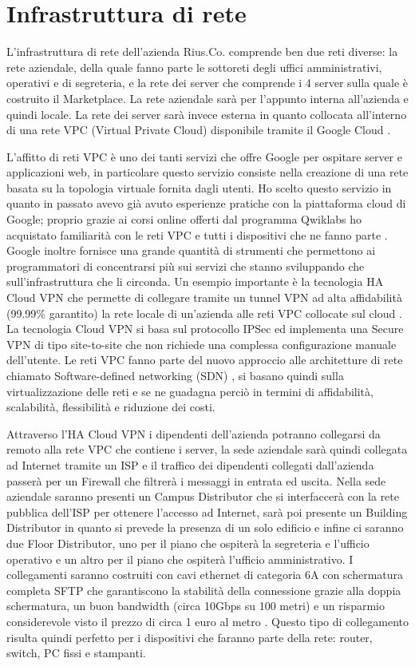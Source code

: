 \section{Infrastruttura di rete}
L'infrastruttura di rete dell'azienda Rius.Co. comprende ben due reti diverse: la rete aziendale, della quale fanno parte le sottoreti degli uffici amministrativi, operativi e di segreteria, e la rete dei server che comprende i 4 server sulla quale è costruito il Marketplace. La rete aziendale sarà per l'appunto interna all'azienda e quindi locale. La rete dei server sarà invece esterna in quanto collocata all'interno di una rete VPC (Virtual Private Cloud) disponibile tramite il Google Cloud \cite{VPC}. 
\medskip

L'affitto di reti VPC è uno dei tanti servizi che offre Google per ospitare server e applicazioni web, in particolare questo servizio consiste nella creazione di una rete basata su la topologia virtuale fornita dagli utenti. Ho scelto questo servizio in quanto in passato avevo già avuto esperienze pratiche con la piattaforma cloud di Google; proprio grazie ai corsi online offerti dal programma Qwiklabs ho acquistato familiarità con le reti VPC e tutti i dispositivi che ne fanno parte \cite{Qwiklabs}. Google inoltre fornisce una grande quantità di strumenti che permettono ai programmatori di concentrarsi più sui servizi che stanno sviluppando che sull'infrastruttura che li circonda. Un esempio importante è la tecnologia HA Cloud VPN che permette di collegare tramite un tunnel VPN ad alta affidabilità (99.99\% garantito) la rete locale di un'azienda alle reti VPC collocate sul cloud \cite{CloudVPN}. La tecnologia Cloud VPN si basa sul protocollo IPSec ed implementa una Secure VPN di tipo site-to-site che non richiede una complessa configurazione manuale dell'utente. Le reti VPC fanno parte del nuovo approccio alle architetture di rete chiamato Software-defined networking (SDN) \cite{SDN}, si basano quindi sulla virtualizzazione delle reti e se ne guadagna perciò in termini di affidabilità, scalabilità, flessibilità e riduzione dei costi.
\medskip

Attraverso l'HA Cloud VPN i dipendenti dell'azienda potranno collegarsi da remoto alla rete VPC che contiene i server, la sede aziendale sarà quindi collegata ad Internet tramite un ISP e il traffico dei dipendenti collegati dall'azienda passerà per un Firewall che filtrerà i messaggi in entrata ed uscita. Nella sede aziendale saranno presenti un Campus Distributor che si interfaccerà con la rete pubblica dell'ISP per ottenere l'accesso ad Internet, sarà poi presente un Building Distributor in quanto si prevede la presenza di un solo edificio e infine ci saranno due Floor Distributor, uno per il piano che ospiterà la segreteria e l'ufficio operativo e un altro per il piano che ospiterà l'ufficio amministrativo. I collegamenti saranno costruiti con cavi ethernet di categoria 6A con schermatura completa SFTP che garantiscono la stabilità della connessione grazie alla doppia schermatura, un buon bandwidth (circa 10Gbps su 100 metri) e un risparmio considerevole visto il prezzo di circa 1 euro al metro \cite{Cables}. Questo tipo di collegamento risulta quindi perfetto per i dispositivi che faranno parte della rete: router, switch, PC fissi e stampanti. 
